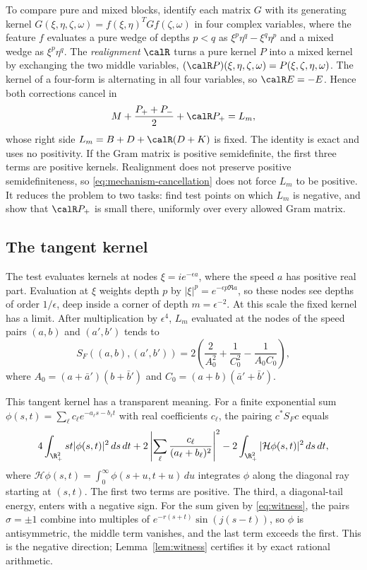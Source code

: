 To compare pure and mixed blocks, identify each matrix $G$ with its
generating kernel $G(\xi,\eta,\zeta,\omega)=f(\xi,\eta)^TGf(\zeta,\omega)$
in four complex variables, where the feature $f$ evaluates a pure wedge
of depths $p<q$ as $\xi^p\eta^q-\xi^q\eta^p$ and a mixed wedge as
$\xi^p\eta^q$. The \emph{realignment} $\calR$ turns a pure kernel $P$ into
a mixed kernel by exchanging the two middle variables,
$(\calR P)(\xi,\eta,\zeta,\omega)=P(\xi,\zeta,\eta,\omega)$. The kernel of a
four-form is alternating in all four variables, so $\calR E=-E$.
Hence both corrections cancel in
\begin{equation}\label{eq:mechanism-cancellation}
 M+\frac{P_++P_-}{2}+\calR P_+=L_m,
\end{equation}
whose right side $L_m=B+D+\calR(D+K)$ is fixed. The identity is exact and
uses no positivity. If the Gram matrix is positive semidefinite, the
first three terms are positive kernels. Realignment does not preserve
positive semidefiniteness, so \eqref{eq:mechanism-cancellation} does not
force $L_m$ to be positive. It reduces the problem to two tasks: find
test points on which $L_m$ is negative, and show that $\calR P_+$ is small
there, uniformly over every allowed Gram matrix.

\subsection{The tangent kernel}\label{sec:mech-tangent}
The test evaluates kernels at nodes $\xi=ie^{-\epsilon a}$, where the
speed $a$ has positive real part. Evaluation at $\xi$ weights depth $p$
by $|\xi|^p=e^{-\epsilon p\Re a}$, so these nodes see
depths of order $1/\epsilon$, deep inside a corner of depth
$m=\epsilon^{-2}$. At this scale the fixed kernel has a limit. After
multiplication by $\epsilon^4$, $L_m$ evaluated at the nodes of the
speed pairs $(a,b)$ and $(a',b')$ tends to
\begin{equation}\label{eq:mechanism-tangent}
 S_F((a,b),(a',b'))=
 2\left(\frac2{A_0^2}+\frac1{C_0^2}-\frac1{A_0C_0}\right),
\end{equation}
where $A_0=(a+\bar a')(b+\bar b')$ and $C_0=(a+b)(\bar a'+\bar b')$.

This tangent kernel has a transparent meaning. For a finite exponential
sum $\phi(s,t)=\sum_\ell c_\ell e^{-a_\ell s-b_\ell t}$ with real coefficients
$c_\ell$, the pairing
$c^*S_Fc$ equals
\begin{equation}\label{eq:energy}
 4\int_{\R_+^2} st|\phi(s,t)|^2\,ds\,dt
 +2\left|\sum_\ell\frac{c_\ell}{(a_\ell+b_\ell)^2}\right|^2
 -2\int_{\R_+^2}|\mathcal H\phi(s,t)|^2\,ds\,dt,
\end{equation}
where $\mathcal H\phi(s,t)=\int_0^\infty\phi(s+u,t+u)\,du$ integrates $\phi$ along
the diagonal ray starting at $(s,t)$. The first two terms are positive.
The third, a diagonal-tail energy, enters with a negative sign. For the
sum given by \eqref{eq:witness}, the pairs $\sigma=\pm1$ combine into
multiples of $e^{-r(s+t)}\sin(j(s-t))$, so $\phi$ is antisymmetric, the
middle term vanishes, and the last term exceeds the first. This is the
negative direction; Lemma~\ref{lem:witness} certifies it by exact
rational arithmetic.

